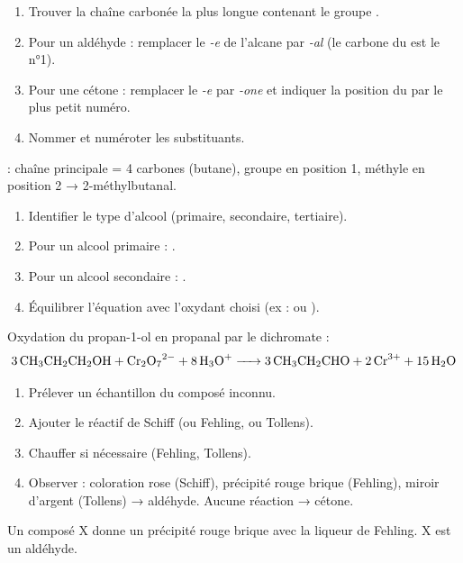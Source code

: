 \begin{enumerate}
    \item Trouver la chaîne carbonée la plus longue contenant le groupe .
    \item Pour un aldéhyde : remplacer le \textit{-e} de l'alcane par \textit{-al} (le carbone du  est le n°1).
    \item Pour une cétone : remplacer le \textit{-e} par \textit{-one} et indiquer la position du  par le plus petit numéro.
    \item Nommer et numéroter les substituants.
\end{enumerate}
\begin{exemple}
 : chaîne principale = 4 carbones (butane), groupe  en position 1, méthyle en position 2 → 2-méthylbutanal.
\end{exemple}

\begin{enumerate}
    \item Identifier le type d'alcool (primaire, secondaire, tertiaire).
    \item Pour un alcool primaire : .
    \item Pour un alcool secondaire : .
    \item Équilibrer l'équation avec l'oxydant choisi (ex :  ou ).
\end{enumerate}
\begin{exemple}
Oxydation du propan-1-ol  en propanal  par le dichromate :
\[
\ce{3 CH3CH2CH2OH + Cr2O7^2- + 8 H3O+ -> 3 CH3CH2CHO + 2 Cr^3+ + 15 H2O}
\]
\end{exemple}

\begin{enumerate}
    \item Prélever un échantillon du composé inconnu.
    \item Ajouter le réactif de Schiff (ou Fehling, ou Tollens).
    \item Chauffer si nécessaire (Fehling, Tollens).
    \item Observer : coloration rose (Schiff), précipité rouge brique (Fehling), miroir d'argent (Tollens) → aldéhyde. Aucune réaction → cétone.
\end{enumerate}
\begin{exemple}
Un composé X donne un précipité rouge brique avec la liqueur de Fehling. X est un aldéhyde.
\end{exemple}

